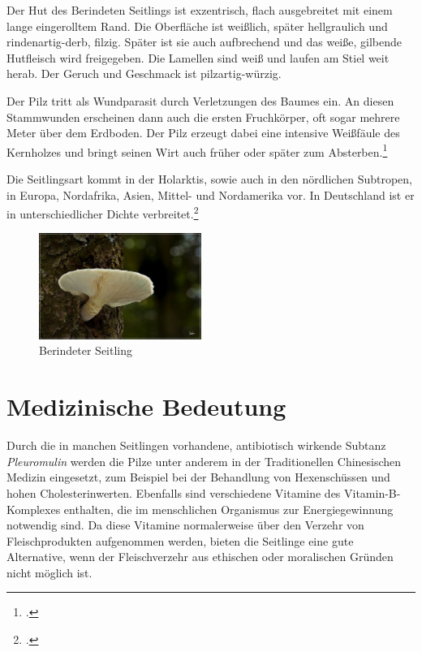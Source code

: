 \documentclass[a4paper,abstracton]{scrreprt}
\begin{document}
Der Hut des Berindeten Seitlings ist exzentrisch, flach ausgebreitet mit einem lange eingerolltem Rand. Die Oberfläche ist weißlich, später hellgraulich und rindenartig-derb, filzig. Später ist sie auch aufbrechend und das weiße, gilbende Hutfleisch wird freigegeben. Die Lamellen sind weiß und laufen am Stiel weit herab. Der Geruch und Geschmack ist pilzartig-würzig.

Der Pilz tritt als Wundparasit durch Verletzungen des Baumes ein. An diesen Stammwunden erscheinen dann auch die ersten Fruchkörper, oft sogar mehrere Meter über dem Erdboden. Der Pilz erzeugt dabei eine intensive Weißfäule des Kernholzes und bringt seinen Wirt auch früher oder später zum Absterben.\footcite{tintling_berindet}

Die Seitlingsart kommt in der Holarktis, sowie auch in den nördlichen Subtropen, in Europa, Nordafrika, Asien, Mittel- und Nordamerika vor. In Deutschland ist er in unterschiedlicher Dichte verbreitet.\footcite{faktenuber_berindet}

\begin{figure}[H]
\centering
\includegraphics[width=200px]{berindeter_seitling}
\caption[Berindeter Seitling]{Berindeter Seitling\protect\footnotemark}
\label{fig:berindeter_seitling}
\end{figure}

\section{Medizinische Bedeutung}
Durch die in manchen Seitlingen vorhandene, antibiotisch wirkende Subtanz \emph{Pleuromulin} werden die Pilze unter anderem in der Traditionellen Chinesischen Medizin eingesetzt, zum Beispiel bei der Behandlung von Hexenschüssen und hohen Cholesterinwerten. Ebenfalls sind verschiedene Vitamine des Vitamin-B-Komplexes enthalten, die im menschlichen Organismus zur Energiegewinnung notwendig sind. Da diese Vitamine normalerweise über den Verzehr von Fleischprodukten aufgenommen werden, bieten die Seitlinge eine gute Alternative, wenn der Fleischverzehr aus ethischen oder moralischen Gründen nicht möglich ist. 
\end{document}
